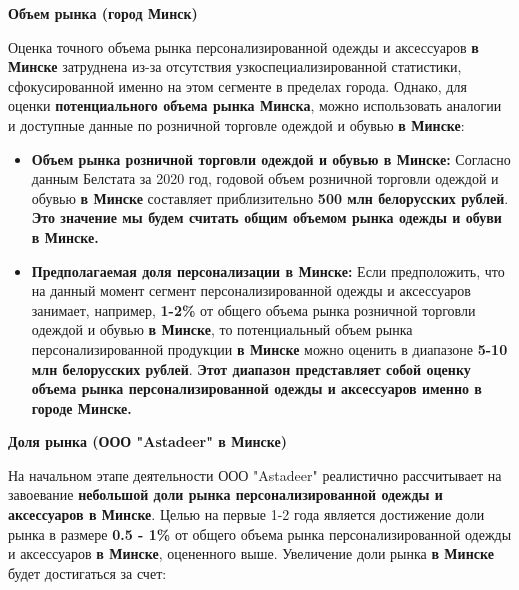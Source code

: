 \vspace{0.3cm}

\textbf{Объем рынка (город Минск)}

Оценка точного объема рынка персонализированной одежды и аксессуаров \textbf{в Минске} затруднена из-за отсутствия узкоспециализированной статистики, сфокусированной именно на этом сегменте в пределах города.  Однако, для оценки \textbf{потенциального объема рынка Минска}, можно использовать аналогии и доступные данные по розничной торговле одеждой и обувью \textbf{в Минске}:

\begin{itemize}
    \item \textbf{Объем рынка розничной торговли одеждой и обувью в Минске:}  Согласно данным Белстата за 2020 год, годовой объем розничной торговли одеждой и обувью \textbf{в Минске} составляет приблизительно \textbf{500 млн белорусских рублей}.  \textbf{Это значение мы будем считать общим объемом рынка одежды и обуви в Минске.}
    \item \textbf{Предполагаемая доля персонализации в Минске:}  Если предположить, что на данный момент сегмент персонализированной одежды и аксессуаров занимает, например, \textbf{1-2\%} от общего объема рынка розничной торговли одеждой и обувью \textbf{в Минске}, то потенциальный объем рынка персонализированной продукции \textbf{в Минске} можно оценить в диапазоне \textbf{5-10 млн белорусских рублей}. \textbf{Этот диапазон представляет собой оценку объема рынка персонализированной одежды и аксессуаров именно в городе Минске.}
\end{itemize}

\vspace{0.3cm}

\textbf{Доля рынка (ООО "Astadeer" в Минске)}

На начальном этапе деятельности ООО "Astadeer" реалистично рассчитывает на завоевание \textbf{небольшой доли рынка персонализированной одежды и аксессуаров в Минске}.  Целью на первые 1-2 года является достижение доли рынка в размере \textbf{0.5 - 1\%} от общего объема рынка персонализированной одежды и аксессуаров \textbf{в Минске}, оцененного выше.  Увеличение доли рынка \textbf{в Минске} будет достигаться за счет:

